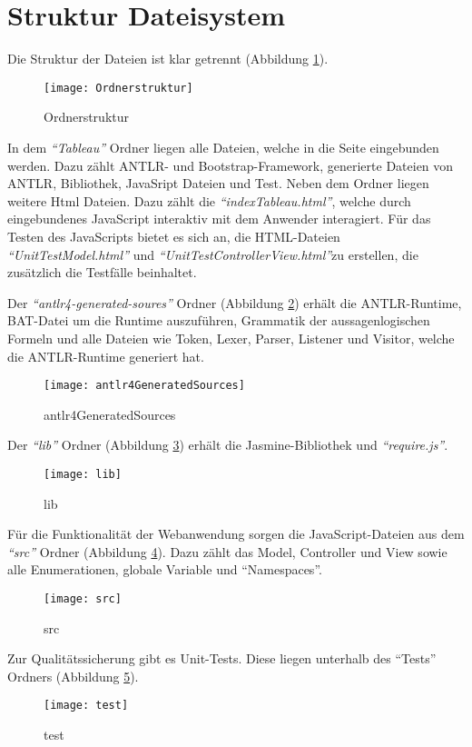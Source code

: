\section{Struktur Dateisystem}
Die Struktur der Dateien ist klar getrennt (Abbildung \ref{fig:Ordnerstruktur}).
\begin{figure}[ !h] \centering
\texttt{[image: Ordnerstruktur]}
\caption[Ordnerstruktur]{Ordnerstruktur}\label{fig:Ordnerstruktur}
\end{figure}

In dem \textit{``Tableau''} Ordner liegen alle Dateien, welche in die Seite eingebunden werden. Dazu zählt ANTLR- und Bootstrap-Framework, generierte Dateien von ANTLR, Bibliothek, JavaSript Dateien und Test. Neben dem Ordner liegen weitere 
Html Dateien. Dazu zählt die 
\textit{``indexTableau.html''}, welche durch eingebundenes JavaScript interaktiv mit dem Anwender interagiert. Für das Testen des JavaScripts bietet es sich an, die HTML-Dateien \textit{``UnitTestModel.html''} und \textit{``UnitTestControllerView.html''}zu erstellen, die zusätzlich die Testfälle beinhaltet.

Der \textit{``antlr4-generated-soures''} Ordner (Abbildung \ref{fig:antlr4-generated-sources Ordner}) erhält die ANTLR-Runtime, BAT-Datei um die Runtime auszuführen, Grammatik der aussagenlogischen Formeln und alle Dateien wie  Token, Lexer, Parser, Listener und Visitor, welche die ANTLR-Runtime generiert hat.
\begin{figure}[ !h] \centering
\texttt{[image: antlr4GeneratedSources]}
\caption[Ordnerstruktur antlr4GeneratedSources]{antlr4GeneratedSources}\label{fig:antlr4-generated-sources Ordner}
\end{figure}

Der \textit{``lib''} Ordner (Abbildung \ref{fig:libOrdner}) erhält die Jasmine-Bibliothek und \textit{``require.js''}.
\begin{figure}[ !h] \centering
\texttt{[image: lib]}
\caption[Ordnerstruktur lib]{lib}\label{fig:libOrdner}
\vspace*{0.3cm}
\end{figure}

Für die Funktionalität der Webanwendung sorgen die JavaScript-Dateien aus dem \textit{``src''} Ordner (Abbildung \ref{fig:srcOrdner}). Dazu zählt das Model, Controller und View sowie alle Enumerationen, globale Variable und ``Namespaces''.
\begin{figure}[ !h] \centering
\texttt{[image: src]}
\caption[Ordnerstruktur src]{src}\label{fig:srcOrdner}
\vspace*{0.3cm}
\end{figure}

Zur Qualitätssicherung gibt es Unit-Tests. Diese liegen unterhalb des ``Tests'' Ordners (Abbildung \ref{fig:testOrdner}).
\begin{figure}[ !h] \centering
\texttt{[image: test]}
\caption[Ordnerstruktur test]{test}\label{fig:testOrdner}
\vspace*{0.3cm}
\end{figure}
